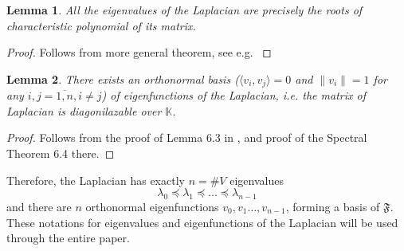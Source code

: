 \documentclass[a4paper,12pt]{amsart}
\newtheorem{lemma}{Lemma}
\theoremstyle{definition}
\newcommand{\K}{\mathbb{K}}
\begin{document}
\begin{lemma}
All the eigenvalues of the Laplacian are precisely the roots of characteristic polynomial of its matrix.
\end{lemma}
\begin{proof}
Follows from more general theorem, see e.g. \cite[Theorem 3.2 on p.562]{Lang}
\end{proof}

\begin{lemma}
There exists an orthonormal basis ($\langle v_i, v_j\rangle = 0$ and $\|v_i\|=1$ for any $i,j=\overline{1,n}, i\ne j$) of eigenfunctions of the Laplacian, i.e. the matrix of Laplacian is diagonilazable over $\K$.
\end{lemma}
\begin{proof}
Follows from the proof of Lemma 6.3 in \cite[p. 582]{Lang}, and proof of the Spectral Theorem 6.4 there.
\end{proof}


Therefore, the Laplacian has exactly $n=\#V$ eigenvalues 
$$
\lambda_0\preceq\lambda_1\preceq\dots \preceq\lambda_{n-1}
$$ 
and there are $n$ orthonormal eigenfunctions $v_0,v_1\dots,v_{n-1}$, forming a basis of $\mathfrak F$. These notations for eigenvalues and eigenfunctions of the Laplacian will be used through the entire paper.
\end{document}
